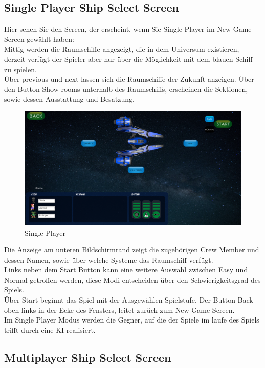 \documentclass[fontsize=12pt,paper=a4,twoside]{scrartcl}
\begin{document}
\subsection{Single Player Ship Select Screen}

Hier sehen Sie den Screen, der erscheint, wenn Sie Single Player im New Game Screen gewählt haben:\\
Mittig werden die Raumschiffe angezeigt, die in dem Universum existieren, derzeit verfügt der Spieler aber nur über die Möglichkeit mit dem blauen Schiff zu spielen.\\
Über previous und next lassen sich die Raumschiffe der Zukunft anzeigen. Über den Button Show rooms unterhalb des Raumschiffs, erscheinen die Sektionen, sowie dessen Ausstattung
und Besatzung.

\begin{figure}[htp]
	\centering
	\includegraphics[width=1.00\linewidth]{pics/SinglePlayer01.png}
	\caption{Single Player}
\end{figure}

Die Anzeige am unteren Bildschirmrand zeigt die zugehörigen Crew Member und dessen Namen, sowie über welche Systeme das Raumschiff verfügt.\\
Links neben dem Start Button kann eine weitere Auswahl zwischen Easy und Normal getroffen werden, diese Modi entscheiden über den Schwierigkeitsgrad des Spiels.\\
Über Start beginnt das Spiel mit der Ausgewählen Spielstufe.
Der Button Back oben links in der Ecke des Fensters, leitet zurück zum New Game Screen.\\
Im Single Player Modus werden die Gegner, auf die der Spiele im laufe des Spiels trifft durch eine KI realisiert.

\subsection{Multiplayer Ship Select Screen}
\end{document}
